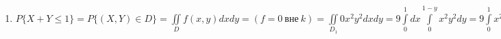 \begin{enumerate}
	\item[4)] %
	$\displaystyle  P\{X + Y \leqslant 1\} = P\{(X, Y) \in D\} = \iint\limits_D f(x,y) dxdy = (f = 0 \ \text{вне} \ k) = \iint\limits_{D_1} 0 x^2 y^2 dx dy = 9 \int\limits_0^1 dx \int\limits_0^{1 - y} x^2 y^2 dy = 9 \int\limits_0^1 x^2 dx \cdot \int\limits_0^{1 - y} y^2 dy = 3 \int\limits_0^1 y^3 (1 - y)^3 dy = \ldots$
\end{enumerate}















